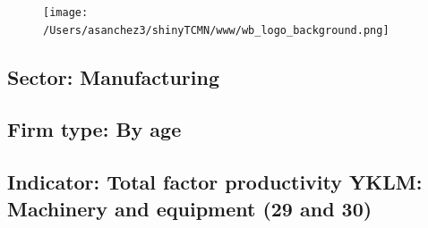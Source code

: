 \documentclass{article}\usepackage[]{graphicx}\usepackage[]{color}
\begin{document}
%

\begin{figure}
  \vspace{-3ex} %
  \hspace{-7ex} %
  \texttt{[image: /Users/asanchez3/shinyTCMN/www/wb\_logo\_background.png]}
\end{figure}
 \begin{minipage}[t]{1.1\textwidth} %
      \vspace{-30ex}
      \hspace{10ex}
  \end{minipage}
  
%
\begin{minipage}[t]{0.99\textwidth} %
  \vspace{-0.5cm}
      \subsection*{\color{white!40!black}Sector: \color{blue!40!black}Manufacturing}
      \subsection*{\color{white!40!black}Firm type: \color{blue!40!black}By age}
      \subsection*{\color{white!40!black}Indicator: \color{blue!40!black}Total factor productivity YKLM: Machinery and equipment (29 and 30)}
  \end{minipage} %
\end{document}
